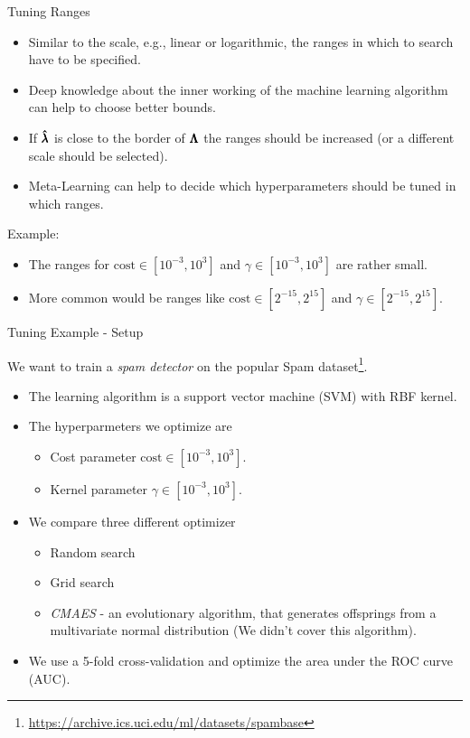 \begin{frame}[allowframebreaks]{Tuning Ranges}
\framebreak

    \begin{itemize}
        \item Similar to the scale, e.g., linear or logarithmic, the ranges in which to search have to be specified.
        \item Deep knowledge about the inner working of the machine learning algorithm can help to choose better bounds.
        \item If $\pmb{\hat{\lambda}}$ is close to the border of $\pmb{\Lambda}$ the ranges should be increased (or a different scale should be selected).
        \item Meta-Learning can help to decide which hyperparameters should be tuned in which ranges.
    \end{itemize}
    \vspace{0.5cm}
    Example:
    \begin{itemize}
            \item The ranges for $\text{cost} \in [10^{-3}, 10^3]$ and $\gamma \in [10^{-3}, 10^3]$ are rather small.
            \item More common would be ranges like $\text{cost} \in [2^{-15}, 2^{15}]$ and $\gamma \in [2^{-15}, 2^{15}]$.
    \end{itemize}

\end{frame}




\begin{frame}{Tuning Example - Setup}

    We want to train a \textit{spam detector} on the popular Spam dataset\footnote{\url{https://archive.ics.uci.edu/ml/datasets/spambase}}.

    \begin{itemize}
        \item The learning algorithm is a support vector machine (SVM) with RBF kernel.
        \item The hyperparmeters we optimize are
            \begin{itemize}
                \item Cost parameter $\text{cost} \in [10^{-3}, 10^3]$.
                \item Kernel parameter $\gamma \in [10^{-3}, 10^3]$.
            \end{itemize}
        \item We compare three different optimizer
            \begin{itemize}
                \item Random search
                \item Grid search
                \item \textit{CMAES} - an evolutionary algorithm, that generates offsprings from a multivariate normal distribution (We didn't cover this algorithm).
            \end{itemize}
        \item We use a 5-fold cross-validation and optimize the area under the ROC curve (AUC).
    \end{itemize}

\end{frame}

